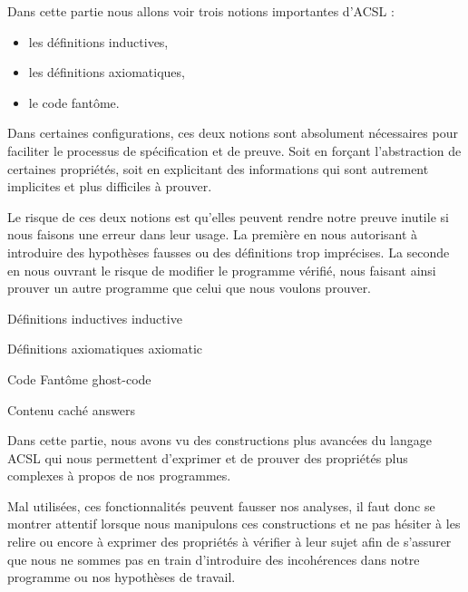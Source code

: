 Dans cette partie nous allons voir trois notions importantes d'ACSL :



\begin{itemize}
\item les définitions inductives,
\item les définitions axiomatiques,
\item le code fantôme.
\end{itemize}


Dans certaines configurations, ces deux notions sont absolument nécessaires pour
faciliter le processus de spécification et de preuve. Soit en forçant
l'abstraction de certaines propriétés, soit en explicitant des informations qui
sont autrement implicites et plus difficiles à prouver.



Le risque de ces deux notions est qu'elles peuvent rendre notre preuve inutile si
nous faisons une erreur dans leur usage. La première en nous autorisant à
introduire des hypothèses fausses ou des définitions trop imprécises. La seconde
en nous ouvrant le risque de modifier le programme vérifié, nous faisant
ainsi prouver un autre programme que celui que nous voulons prouver.


\begin{levelTwo}
  {Définitions inductives}
  {inductive}
\end{levelTwo}


\begin{levelTwo}
  {Définitions axiomatiques}
  {axiomatic}
\end{levelTwo}


\begin{levelTwo}
  {Code Fantôme}
  {ghost-code}
\end{levelTwo}


\begin{levelTwo}
  {Contenu caché}
  {answers}
\end{levelTwo}


\horizontalLine
\newpage


Dans cette partie, nous avons vu des constructions plus avancées du langage ACSL
qui nous permettent d'exprimer et de prouver des propriétés plus complexes à
propos de nos programmes.



Mal utilisées, ces fonctionnalités peuvent fausser nos analyses, il faut donc se
montrer attentif lorsque nous manipulons ces constructions et ne pas hésiter à
les relire ou encore à exprimer des propriétés à vérifier à leur sujet afin de
s'assurer que nous ne sommes pas en train d'introduire des incohérences dans
notre programme ou nos hypothèses de travail.
